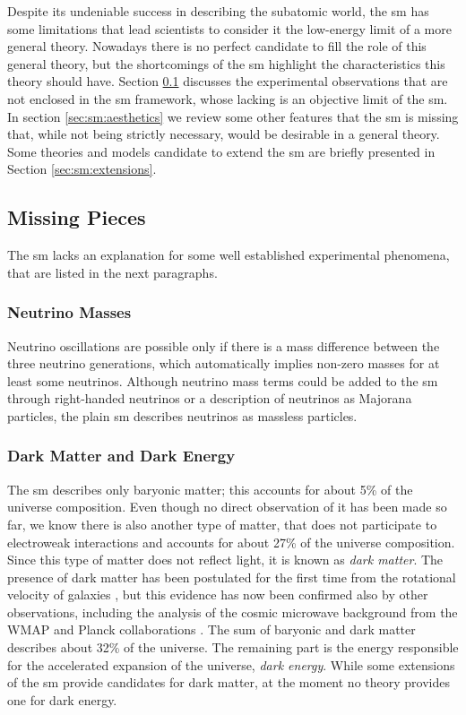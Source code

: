 Despite its undeniable success in describing the subatomic world, the \gls{sm} has some limitations that lead scientists to consider it the low-energy limit of a more general theory. Nowadays there is no perfect candidate to fill the role of this general theory, but the shortcomings of the \gls{sm} highlight the characteristics this theory should have. Section \ref{sec:sm:missingpieces} discusses the experimental observations that are not enclosed in the \gls{sm} framework, whose lacking is an objective limit of the \gls{sm}. In section \ref{sec:sm:aesthetics} we review some other features that the \gls{sm} is missing that, while not being strictly necessary, would be desirable in a general theory. Some theories and models candidate to extend the \gls{sm} are briefly presented in Section \ref{sec:sm:extensions}.

\subsection{Missing Pieces}
\label{sec:sm:missingpieces}

The \gls{sm} lacks an explanation for some well established experimental phenomena, that are listed in the next paragraphs.

\subsubsection*{Neutrino Masses}

Neutrino oscillations \cite{PhysRevLett.81.1562} are possible only if there is a mass difference between the three neutrino generations, which automatically implies non-zero masses for at least some neutrinos. Although neutrino mass terms could be added to the \gls{sm} through right-handed neutrinos or a description of neutrinos as Majorana particles, the plain \gls{sm} describes neutrinos as massless particles.

\subsubsection*{Dark Matter and Dark Energy}

The \gls{sm} describes only baryonic matter; this accounts for about 5\% of the universe composition. Even though no direct observation of it has been made so far, we know there is also another type of matter, that does not participate to electroweak interactions and  accounts for about 27\% of the universe composition.  Since this type of matter does not reflect light, it is known as \textit{dark matter}. The presence of dark matter has been postulated for the first time from the rotational velocity of galaxies \cite{Zwicky:1937zza}, but this evidence has now been confirmed also by other observations, including the analysis of the cosmic microwave background from the WMAP and Planck collaborations \cite{Larson:2010gs} \cite{Ade:2013zuv}. The sum of baryonic and dark matter describes about 32\% of the universe. The remaining part is the energy responsible for the accelerated expansion of the universe, \textit{dark energy}. While some extensions of the \gls{sm} provide candidates for dark matter, at the moment no theory provides one for dark energy.


